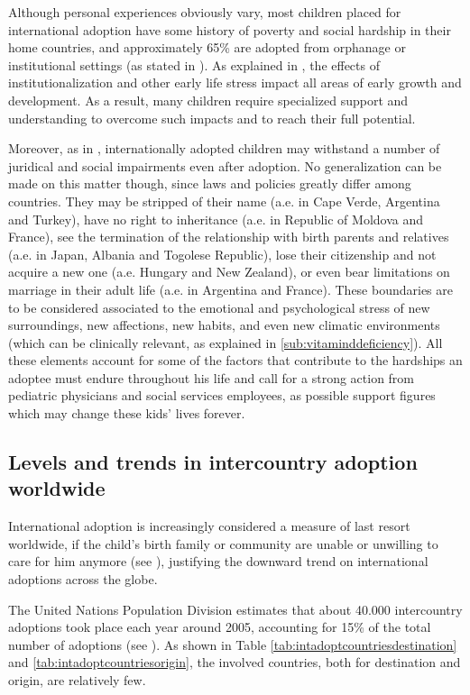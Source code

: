 Although personal experiences obviously vary, most children placed for international adoption have some history of poverty and social hardship in their home countries, and approximately 65\% are adopted from orphanage or institutional settings (as stated in \cite{caringfor}). As explained in \cite{nelson}, the effects of institutionalization and other early life stress impact all areas of early growth and development. As a result, many children require specialized support and understanding to overcome such impacts and to reach their full potential. 

Moreover, as in \cite{unreport}, internationally adopted children may withstand a number of juridical and social impairments even after adoption. No generalization can be made on this matter though, since laws and policies greatly differ among countries. They may be stripped of their name (a.e. in Cape Verde, Argentina and Turkey), have no right to inheritance (a.e. in Republic of Moldova and France), see the termination of the relationship with birth parents and relatives (a.e. in Japan, Albania and Togolese Republic), lose their citizenship and not acquire a new one (a.e. Hungary and New Zealand), or even bear limitations on marriage in their adult life (a.e. in Argentina and France). These boundaries are to be considered associated to the emotional and psychological stress of new surroundings, new affections, new habits, and even new climatic environments (which can be clinically relevant, as explained in \ref{sub:vitaminddeficiency}). \linebreak All these elements account for some of the factors that contribute to the hardships an adoptee must endure throughout his life and call for a strong action from pediatric physicians and social services employees, as possible support figures which may change these kids' lives forever.

\subsection{Levels and trends in intercountry adoption worldwide}\label{sub:levelsintercountry}
International adoption is increasingly considered a measure of last resort worldwide, if the child's birth family or community are unable or unwilling to care for him anymore (see \cite{nelson}), justifying the downward trend on international adoptions across the globe. 

The United Nations Population Division estimates that about 40.000 intercountry adoptions took place each year around 2005, accounting for 15\% of the total number of adoptions (see \cite{unreport}). As shown in Table \ref{tab:intadoptcountriesdestination} and \ref{tab:intadoptcountriesorigin}, the involved countries, both for destination and origin, are relatively few.

